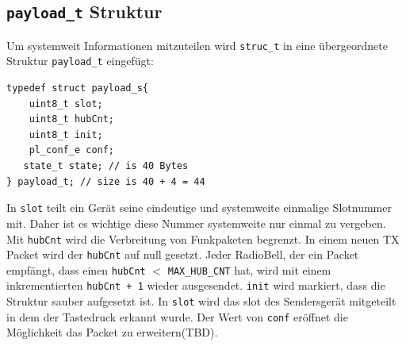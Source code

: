 \subsection{\texttt{payload\_t} Struktur}
Um systemweit Informationen mitzuteilen wird \verb|struc_t| in eine übergeordnete Struktur \verb|payload_t| eingefügt:
\begin{listing}
\begin{verbatim}
typedef struct payload_s{
    uint8_t slot;
    uint8_t hubCnt;
    uint8_t init;
    pl_conf_e conf;
   state_t state; // is 40 Bytes
} payload_t; // size is 40 + 4 = 44
\end{verbatim}
\caption{Definition der \texttt{payload\_t} Struktur}
\label{payload_t}
\end{listing}
In \verb|slot| teilt ein Gerät seine eindeutige und systemweite einmalige Slotnummer mit. Daher ist es wichtige diese Nummer systemweite nur einmal zu vergeben. Mit \verb|hubCnt| wird die Verbreitung von Funkpaketen begrenzt. In einem neuen TX Packet wird der \verb|hubCnt| auf null gesetzt. Jeder RadioBell, der ein Packet empfängt, dass einen \verb|hubCnt| $<$ \verb|MAX_HUB_CNT| hat, wird mit einem inkrementierten \verb|hubCnt + 1| wieder ausgesendet.  \verb|init| wird markiert, dass die Struktur sauber aufgesetzt ist. In \verb|slot| wird das slot des Sendersgerät mitgeteilt in dem der Tastedruck erkannt wurde. Der Wert von \verb|conf| eröffnet die Möglichkeit das Packet zu erweitern(TBD).

